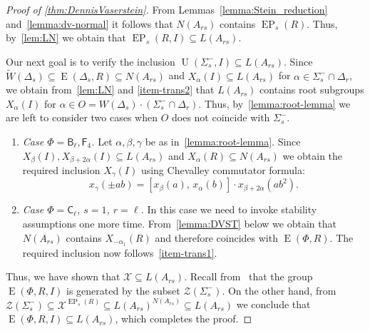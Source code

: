 \documentclass[11pt]{amsart}
\theoremstyle{plain}
\numberwithin{equation}{section}
\numberwithin{lemma}{section}
\theoremstyle{definition}
\theoremstyle{remark}
\DeclareMathOperator{\E}{E}
\DeclareMathOperator{\EP}{EP}
\DeclareMathOperator{\U}{U}
\newcommand{\rB}{\mathsf{B}}
\newcommand{\rC}{\mathsf{C}}
\newcommand{\rF}{\mathsf{F}}
\begin{document}
\begin{proof} [Proof of \cref{thm:DennisVaserstein}]
From Lemmas~\ref{lemma:Stein_reduction} and~\ref{lemma:dv-normal} it follows that $N(A_{rs})$ contains $\EP_s(R)$.
Thus, by~\cref{lem:LN} we obtain that $\EP_s(R, I) \subseteq L(A_{rs})$.

Our next goal is to verify the inclusion $\U(\Sigma_s^-, I) \subseteq L(A_{rs})$.
Since $\widetilde{W}(\Delta_s) \subseteq \E(\Delta_s, R) \subseteq N(A_{rs})$ and 
 $X_{\alpha}(I) \subseteq L(A_{rs})$ for $\alpha \in \Sigma^-_s\cap \Delta_r$, 
we obtain from~\cref{lem:LN} and \cref{item-trans2} that $L(A_{rs})$ contains root subgroups $X_\alpha(I)$ for $\alpha \in O = W(\Delta_s) \cdot (\Sigma^-_s\cap \Delta_r)$.
Thus, by~\cref{lemma:root-lemma} we are left to consider two cases when $O$ does not coincide with $\Sigma^-_s$. 
\begin{enumerate} 
  \item \textit{Case $\Phi = \rB_\ell, \rF_4$.} Let $\alpha, \beta, \gamma$ be as in~\cref{lemma:root-lemma}.
  Since $X_{\beta}(I), X_{\beta+2\alpha}(I) \subseteq L(A_{rs})$ and $X_{\alpha}(R) \subseteq N(A_{rs})$ we obtain the required inclusion
   $X_{\gamma}(I)$ using Chevalley commutator formula:
   \begin{equation} \nonumber x_{\gamma}(\pm ab) = [x_{\beta}(a),\, x_{\alpha}(b)] \cdot x_{\beta + 2\alpha}(ab^2). \end{equation}
 \item \textit{Case $\Phi = \rC_\ell$, $s=1$, $r=\ell$.} 
  In this case we need to invoke stability assumptions one more time.
  From~\cref{lemma:DVST} below we obtain that $N(A_{rs})$ contains $X_{-\alpha_1}(R)$ and therefore coincides with $\E(\Phi, R)$.
  The required inclusion now follows~\cref{item-trans1}.
\end{enumerate}
Thus, we have shown that $\mathcal{X}\subseteq L(A_{rs})$. 
Recall from~\cite[Theorem~3.4]{S} that the group $\E(\Phi, R, I)$ is generated by the subset $\mathcal{Z}(\Sigma_s^-)$.
On the other hand, from $\mathcal{Z}(\Sigma_s^-) \subseteq \mathcal{X}^{\EP_s(R)} \subseteq L(A_{rs})^{N(A_{rs})} \subseteq L(A_{rs})$ we conclude that 
 $\E(\Phi, R, I) \subseteq L(A_{rs})$, which completes the proof.
\end{proof}
\end{document}
